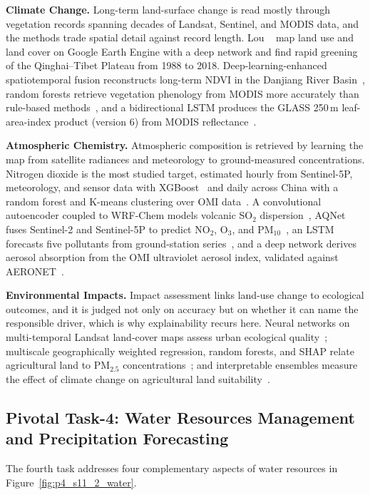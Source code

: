 \textbf{Climate Change.} Long-term land-surface change is read mostly through vegetation records spanning decades of Landsat, Sentinel, and MODIS data, and the methods trade spatial detail against record length.
Lou \etal~\cite{lou2023deep} map land use and land cover on Google Earth Engine with a deep network and find rapid greening of the Qinghai--Tibet Plateau from 1988 to 2018.
Deep-learning-enhanced spatiotemporal fusion reconstructs long-term NDVI in the Danjiang River Basin~\cite{wang2023applying}, random forests retrieve vegetation phenology from MODIS more accurately than rule-based methods~\cite{XinLLLZ20}, and a bidirectional LSTM produces the GLASS 250\,m leaf-area-index product (version 6) from MODIS reflectance~\cite{ma2022development}.

\textbf{Atmospheric Chemistry.} Atmospheric composition is retrieved by learning the map from satellite radiances and meteorology to ground-measured concentrations.
Nitrogen dioxide is the most studied target, estimated hourly from Sentinel-5P, meteorology, and sensor data with XGBoost~\cite{kim2021importance} and daily across China with a random forest and K-means clustering over OMI data~\cite{dou2021estimates}.
A convolutional autoencoder coupled to WRF-Chem models volcanic SO$_2$ dispersion~\cite{opio2023modeling}, AQNet fuses Sentinel-2 and Sentinel-5P to predict NO$_2$, O$_3$, and PM$_{10}$~\cite{rowley2023predicting}, an LSTM forecasts five pollutants from ground-station series~\cite{seng2021spatiotemporal}, and a deep network derives aerosol absorption from the OMI ultraviolet aerosol index, validated against AERONET~\cite{SunVVL21}.

\textbf{Environmental Impacts.} Impact assessment links land-use change to ecological outcomes, and it is judged not only on accuracy but on whether it can name the responsible driver, which is why explainability recurs here.
Neural networks on multi-temporal Landsat land-cover maps assess urban ecological quality~\cite{alqadhi2024applying}; multiscale geographically weighted regression, random forests, and SHAP relate agricultural land to PM$_{2.5}$ concentrations~\cite{gianquintieri2024implementation}; and interpretable ensembles measure the effect of climate change on agricultural land suitability~\cite{ShevchenkoLTBGKNSKM24}.

\subsection{Pivotal Task-4: Water Resources Management and Precipitation Forecasting}
\label{subsec:p4-sec11-2-pivotal-task-4-water-resources-management-and-precipitation-forecasting}
The fourth task addresses four complementary aspects of water resources in Figure~\ref{fig:p4_s11_2_water}.

